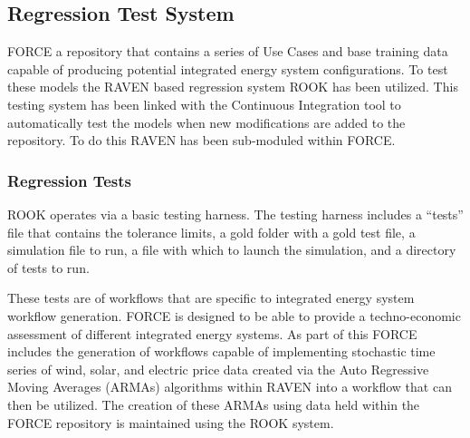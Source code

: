 \subsection{Regression Test System}
FORCE a repository that contains a series of Use Cases and base training data capable of producing potential integrated energy system configurations. To test these models the RAVEN based regression system ROOK has been utilized. This testing system has been linked with the Continuous Integration tool to automatically test the models when new modifications are added to the repository. To do this RAVEN has been sub-moduled within FORCE. 

\subsubsection{Regression Tests}
ROOK operates via a basic testing harness. The testing harness includes a “tests” file that contains the tolerance limits, a gold folder with a gold test file, a simulation file to run, a file with which to launch the simulation, and a directory of tests to run. 

These tests are of workflows that are specific to integrated energy system workflow generation. FORCE is designed to be able to provide a techno-economic assessment of different integrated energy systems. As part of this FORCE includes the generation of workflows capable of implementing stochastic time series of wind, solar, and electric price data created via the Auto Regressive Moving Averages (ARMAs) algorithms within RAVEN into a workflow that can then be utilized. The creation of these ARMAs using data held within the FORCE repository is maintained using the ROOK system. 



